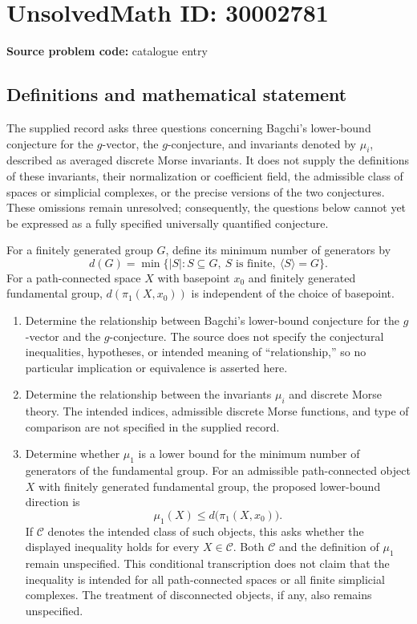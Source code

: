 \documentclass[11pt]{article}
\begin{document}
\section*{UnsolvedMath ID: 30002781}
\textbf{Source problem code:} catalogue entry
\subsection{Definitions and mathematical statement}
The supplied record asks three questions concerning Bagchi's lower-bound conjecture for the \(g\)-vector, the \(g\)-conjecture, and invariants denoted by \(\mu_i\), described as averaged discrete Morse invariants. It does not supply the definitions of these invariants, their normalization or coefficient field, the admissible class of spaces or simplicial complexes, or the precise versions of the two conjectures. These omissions remain unresolved; consequently, the questions below cannot yet be expressed as a fully specified universally quantified conjecture.

For a finitely generated group \(G\), define its minimum number of generators by
\[
 d(G)=\min\bigl\{|S|: S\subseteq G,\ S\text{ is finite},\ \langle S\rangle=G\bigr\}.
\]
For a path-connected space \(X\) with basepoint \(x_0\) and finitely generated fundamental group, \(d(\pi_1(X,x_0))\) is independent of the choice of basepoint.

\begin{enumerate}
\item Determine the relationship between Bagchi's lower-bound conjecture for the \(g\)-vector and the \(g\)-conjecture. The source does not specify the conjectural inequalities, hypotheses, or intended meaning of ``relationship,'' so no particular implication or equivalence is asserted here.
\item Determine the relationship between the invariants \(\mu_i\) and discrete Morse theory. The intended indices, admissible discrete Morse functions, and type of comparison are not specified in the supplied record.
\item Determine whether \(\mu_1\) is a lower bound for the minimum number of generators of the fundamental group. For an admissible path-connected object \(X\) with finitely generated fundamental group, the proposed lower-bound direction is
\[
 \mu_1(X)\leq d\bigl(\pi_1(X,x_0)\bigr).
\]
If \(\mathcal C\) denotes the intended class of such objects, this asks whether the displayed inequality holds for every \(X\in\mathcal C\). Both \(\mathcal C\) and the definition of \(\mu_1\) remain unspecified. This conditional transcription does not claim that the inequality is intended for all path-connected spaces or all finite simplicial complexes. The treatment of disconnected objects, if any, also remains unspecified.
\end{enumerate}
\end{document}
